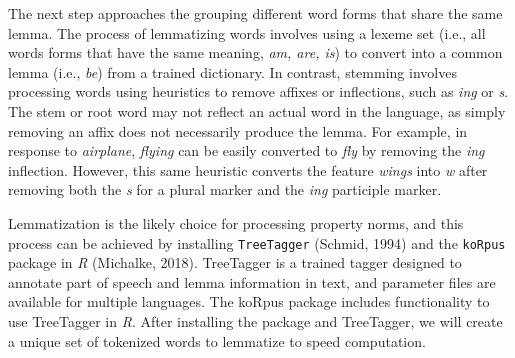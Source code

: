 \documentclass[man]{apa6}
\newenvironment{Shaded}{\begin{snugshade}}{\end{snugshade}}
\newcommand{\CommentTok}[1]{\textcolor[rgb]{0.56,0.35,0.01}{\textit{#1}}}
\newcommand{\DataTypeTok}[1]{\textcolor[rgb]{0.13,0.29,0.53}{#1}}
\newcommand{\KeywordTok}[1]{\textcolor[rgb]{0.13,0.29,0.53}{\textbf{#1}}}
\newcommand{\NormalTok}[1]{#1}
\newcommand{\OperatorTok}[1]{\textcolor[rgb]{0.81,0.36,0.00}{\textbf{#1}}}
\newcommand{\StringTok}[1]{\textcolor[rgb]{0.31,0.60,0.02}{#1}}
\begin{document}
The next step approaches the grouping different word forms that share the same lemma. The process of lemmatizing words involves using a lexeme set (i.e., all words forms that have the same meaning, \emph{am, are, is}) to convert into a common lemma (i.e., \emph{be}) from a trained dictionary. In contrast, stemming involves processing words using heuristics to remove affixes or inflections, such as \emph{ing} or \emph{s}. The stem or root word may not reflect an actual word in the language, as simply removing an affix does not necessarily produce the lemma. For example, in response to \emph{airplane}, \emph{flying} can be easily converted to \emph{fly} by removing the \emph{ing} inflection. However, this same heuristic converts the feature \emph{wings} into \emph{w} after removing both the \emph{s} for a plural marker and the \emph{ing} participle marker.

Lemmatization is the likely choice for processing property norms, and this process can be achieved by installing \texttt{TreeTagger} (Schmid, 1994) and the \texttt{koRpus} package in \emph{R} (Michalke, 2018). TreeTagger is a trained tagger designed to annotate part of speech and lemma information in text, and parameter files are available for multiple languages. The koRpus package includes functionality to use TreeTagger in \emph{R}. After installing the package and TreeTagger, we will create a unique set of tokenized words to lemmatize to speed computation.

\scriptsize

\begin{Shaded}
\end{Shaded}
\end{document}
